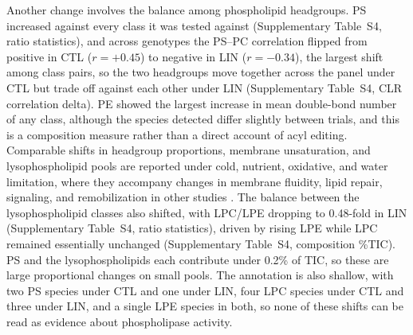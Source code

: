 Another change involves the balance among phospholipid headgroups. PS increased against every class it was tested against (Supplementary Table~S4, ratio statistics), and across genotypes the PS--PC correlation flipped from positive in CTL ($r=+0.45$) to negative in LIN ($r=-0.34$), the largest shift among class pairs, so the two headgroups move together across the panel under CTL but trade off against each other under LIN (Supplementary Table~S4, CLR correlation delta). PE showed the largest increase in mean double-bond number of any class, although the species detected differ slightly between trials, and this is a composition measure rather than a direct account of acyl editing. Comparable shifts in headgroup proportions, membrane unsaturation, and lysophospholipid pools are reported under cold, nutrient, oxidative, and water limitation, where they accompany changes in membrane fluidity, lipid repair, signaling, and remobilization in other studies \citep{Hou2016, Rawat2021, Yan2025, Zhang2020}. The balance between the lysophospholipid classes also shifted, with LPC/LPE dropping to 0.48-fold in LIN (Supplementary Table~S4, ratio statistics), driven by rising LPE while LPC remained essentially unchanged (Supplementary Table~S4, composition \%TIC). PS and the lysophospholipids each contribute under 0.2\% of TIC, so these are large proportional changes on small pools. The annotation is also shallow, with two PS species under CTL and one under LIN, four LPC species under CTL and three under LIN, and a single LPE species in both, so none of these shifts can be read as evidence about phospholipase activity.


